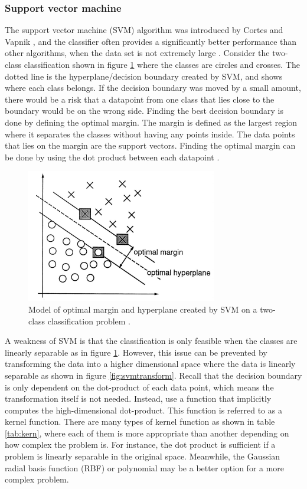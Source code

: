 \documentclass[USenglish]{ifimaster}  %
\begin{document}
\subsubsection{Support vector machine}
The support vector machine (SVM) algorithm was introduced by Cortes and Vapnik \cite{Cortes1995}, and the classifier often provides a significantly better performance than other algorithms, when the data set is not extremely large \cite{Marsland:2009:MLA:1571643}. Consider the two-class classification shown in figure \ref{fig:SVM} where the classes are circles and crosses. The dotted line is the hyperplane/decision boundary created by SVM, and shows where each class belongs. If the
decision boundary was moved by a small amount, there would be a risk that a datapoint from one class that lies close to the boundary would be on the wrong side. Finding the best decision boundary is done by defining the optimal margin. The margin is defined as the largest region where it separates the classes without having any points inside. The data points that lies on the margin are the support vectors. Finding the optimal margin can be done by using the dot product between each datapoint \cite{Cortes1995}.



\begin{figure}[h]
	\centering
	\includegraphics{Figures/SVM.PNG}
	\caption[An example of SVM classification]{Model of optimal margin and hyperplane created by SVM on a two-class classification problem \cite{Cortes1995}.}
	\label{fig:SVM}
\end{figure}
\FloatBarrier

A weakness of SVM is that the classification is only feasible when the classes are linearly separable as in figure \ref{fig:SVM}. However, this issue can be prevented by transforming the data into a higher dimensional space where the data is linearly separable as shown in figure \ref{fig:svmtransform}. Recall that the decision boundary is only dependent on the dot-product of each data point, which means the transformation itself is not needed. Instead, use a function that implicitly computes the high-dimensional dot-product. This function is referred to as a kernel function.
There are many types of kernel function as shown in table \ref{tab:kern}, where each of them is more appropriate than another depending on how complex the problem is. For instance, the dot product is sufficient if a problem is linearly separable in the original space.
Meanwhile, the Gaussian radial basis function (RBF) or polynomial may be a better option for a more complex problem.
\end{document}
